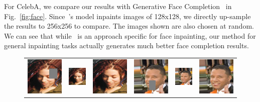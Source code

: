 For CelebA, we compare our results with Generative Face Completion~\cite{li2017generative} in Fig.~\ref{fig:face}. Since~\cite{li2017generative}'s model inpaints images of 128x128, we directly up-sample the results to 256x256 to compare. The images shown are also chosen at random. We can see that while~\cite{li2017generative} is an approach specific for face inpainting, our method for general inpainting tasks actually generates much better face completion results.

\begin{figure}[!ht]
\centering
\small
\setlength\tabcolsep{1pt}
\begin{tabular}{cccccc}
\includegraphics[width=.16\textwidth]{figures/face/000189_input_image.jpg}&
\includegraphics[width=.16\textwidth]{figures/face/res1/res.jpg}&
\includegraphics[width=.16\textwidth]{figures/face/000189_synthesized_image.jpg}&
\includegraphics[width=.16\textwidth]{figures/face/000194_input_image.jpg}&
\includegraphics[width=.16\textwidth]{figures/face/res2/res.jpg}&
\includegraphics[width=.16\textwidth]{figures/face/000194_synthesized_image.jpg}\\

\end{tabular}
\end{figure}
